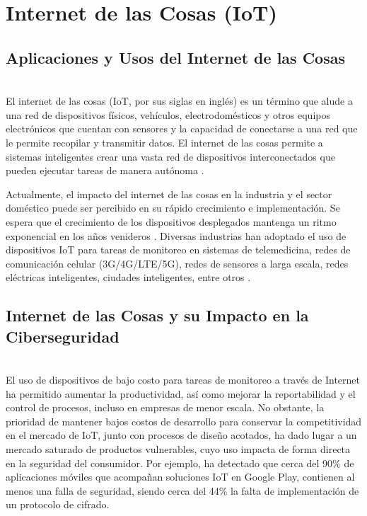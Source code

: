 \section{Internet de las Cosas (IoT)}
\subsection{Aplicaciones y Usos del Internet de las Cosas}
\hfil \\
El internet de las cosas (IoT, por sus siglas en inglés) es un término que
alude a una red de dispositivos físicos, vehículos, electrodomésticos y otros
equipos electrónicos que cuentan con sensores y la capacidad de conectarse a
una red que le permite recopilar y transmitir datos.
El internet de las cosas permite a sistemas inteligentes crear una vasta
red de dispositivos interconectados que pueden ejecutar tareas de manera
autónoma \cite{ibmCostDataBreach2023}. 

Actualmente, el impacto del internet de las cosas en la industria y el
sector doméstico puede ser percibido en su rápido crecimiento e
implementación. Se espera que el crecimiento de los dispositivos desplegados
mantenga un ritmo exponencial en los años venideros \cite{meolaLookExamplesIoT2023}. Diversas industrias han adoptado 
el uso de dispositivos IoT para tareas de monitoreo en sistemas de telemedicina, redes de comunicación
celular (3G/4G/LTE/5G), redes de sensores a larga escala, redes eléctricas inteligentes, ciudades inteligentes, entre otros \cite{mumtazGuestEditorial5G2018}.


\subsection{Internet de las Cosas y su Impacto en la Ciberseguridad}
\hfil \\
El uso de dispositivos de bajo costo para tareas de monitoreo a través de Internet ha permitido aumentar la productividad, así como mejorar la reportabilidad y el control de procesos, incluso en empresas de menor escala. No obstante, la prioridad de mantener bajos costos de desarrollo para conservar la competitividad en el mercado de IoT, junto con procesos de diseño acotados, ha dado lugar a un mercado saturado de productos vulnerables, cuyo uso impacta de forma directa en la seguridad del consumidor. 
Por ejemplo, \cite{jinUnderstandingIoTSecurity2022} ha detectado que cerca del 90\% de aplicaciones móviles que acompañan soluciones IoT en Google Play, contienen al menos una falla de seguridad, siendo cerca del 44\% la falta de implementación de un protocolo de cifrado.

